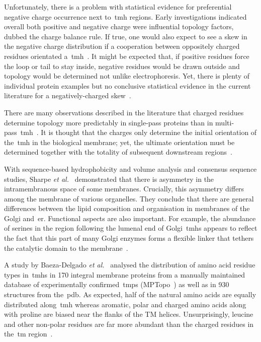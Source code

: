 Unfortunately, there is a problem with statistical evidence for preferential negative charge occurrence next to~\gls{tmh} regions.
Early investigations indicated overall both positive and negative charge were influential topology factors, dubbed the charge balance rule.
If true, one would also expect to see a skew in the negative charge distribution if a cooperation between oppositely charged residues orientated a~\gls{tmh}~\cite{Sipos1993, Hartmann1989}.
It might be expected that, if positive residues force the loop or tail to stay inside, negative residues would be drawn outside and topology would be determined not unlike electrophoresis.
Yet, there is plenty of individual protein examples but no conclusive statistical evidence in the current literature for a negatively\--charged skew~\cite{Sharpe2010, Baeza-Delgado2013, Granseth2005, Pogozheva2013, Nilsson2005a, Andersson1992}.

There are many observations described in the literature that charged residues determine topology more predictably in single\--pass proteins than in multi\--pass~\gls{tmh}~\cite{Kim1994, Harley1998}.
It is thought that the charges only determine the initial orientation of the~\gls{tmh} in the biological membrane; yet, the ultimate orientation must be determined together with the totality of subsequent downstream regions~\cite{Sato1998}.

With sequence-based hydrophobicity and volume analysis and consensus sequence studies, Sharpe \textit{et al.}~\cite{Sharpe2010} demonstrated that there is asymmetry in the intramembranous space of some membranes.
Crucially, this asymmetry differs among the membrane of various organelles.
They conclude that there are general differences between the lipid composition and organisation in membranes of the Golgi and~\gls{er}.
Functional aspects are also important.
For example, the abundance of serines in the region following the lumenal end of Golgi~\gls{tmh}s appears to reflect the fact that this part of many Golgi enzymes forms a flexible linker that tethers the catalytic domain to the membrane~\cite{Sharpe2010}.

A study by Baeza-Delgado \textit{et al.}~\cite{Baeza-Delgado2013} analysed the distribution of amino acid residue types in~\gls{tmh}s in 170 integral membrane proteins from a manually maintained database of experimentally confirmed~\gls{tmp}s (MPTopo~\cite{Jayasinghe2001}) as well as in 930 structures from the~\gls{pdb}.
As expected, half of the natural amino acids are equally distributed along~\gls{tmh} whereas aromatic, polar and charged amino acids along with proline are biased near the flanks of the TM helices.
Unsurprisingly, leucine and other non-polar residues are far more abundant than the charged residues in the~\gls{tm} region~\cite{Sharpe2010, Baeza-Delgado2013}.

